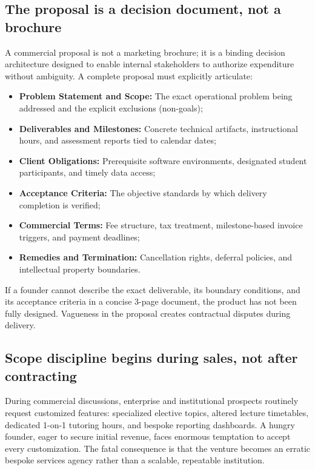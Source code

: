 \subsection{The proposal is a decision document, not a brochure}

A commercial proposal is not a marketing brochure; it is a binding decision architecture designed to enable internal stakeholders to authorize expenditure without ambiguity. A complete proposal must explicitly articulate:
\begin{itemize}
\item \textbf{Problem Statement and Scope:} The exact operational problem being addressed and the explicit exclusions (non-goals);
\item \textbf{Deliverables and Milestones:} Concrete technical artifacts, instructional hours, and assessment reports tied to calendar dates;
\item \textbf{Client Obligations:} Prerequisite software environments, designated student participants, and timely data access;
\item \textbf{Acceptance Criteria:} The objective standards by which delivery completion is verified;
\item \textbf{Commercial Terms:} Fee structure, tax treatment, milestone-based invoice triggers, and payment deadlines;
\item \textbf{Remedies and Termination:} Cancellation rights, deferral policies, and intellectual property boundaries.
\end{itemize}
If a founder cannot describe the exact deliverable, its boundary conditions, and its acceptance criteria in a concise 3-page document, the product has not been fully designed. Vagueness in the proposal creates contractual disputes during delivery.

\subsection{Scope discipline begins during sales, not after contracting}

During commercial discussions, enterprise and institutional prospects routinely request customized features: specialized elective topics, altered lecture timetables, dedicated 1-on-1 tutoring hours, and bespoke reporting dashboards. A hungry founder, eager to secure initial revenue, faces enormous temptation to accept every customization. The fatal consequence is that the venture becomes an erratic bespoke services agency rather than a scalable, repeatable institution.

